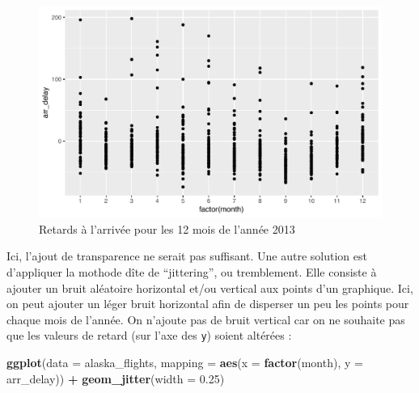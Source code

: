 \documentclass[a4paperpaper,]{article}
\newenvironment{Shaded}{\begin{snugshade}}{\end{snugshade}}
\newcommand{\KeywordTok}[1]{\textcolor[rgb]{0.13,0.29,0.53}{\textbf{#1}}}
\newcommand{\DataTypeTok}[1]{\textcolor[rgb]{0.13,0.29,0.53}{#1}}
\newcommand{\FloatTok}[1]{\textcolor[rgb]{0.00,0.00,0.81}{#1}}
\newcommand{\StringTok}[1]{\textcolor[rgb]{0.31,0.60,0.02}{#1}}
\newcommand{\OperatorTok}[1]{\textcolor[rgb]{0.81,0.36,0.00}{\textbf{#1}}}
\newcommand{\NormalTok}[1]{#1}
\theoremstyle{definition}
\theoremstyle{definition}
\theoremstyle{definition}
\theoremstyle{remark}
\begin{document}
\begin{figure}[htpb]

{\centering \includegraphics[width=0.9\linewidth]{figure/unnamed-chunk-41-1} 

}

\caption{Retards à l'arrivée pour les 12 mois de l'année 2013}\label{fig:unnamed-chunk-41}
\end{figure}

Ici, l'ajout de transparence ne serait pas suffisant. Une autre solution
est d'appliquer la mothode dîte de ``jittering'', ou tremblement. Elle
consiste à ajouter un bruit aléatoire horizontal et/ou vertical aux
points d'un graphique. Ici, on peut ajouter un léger bruit horizontal
afin de disperser un peu les points pour chaque mois de l'année. On
n'ajoute pas de bruit vertical car on ne souhaite pas que les valeurs de
retard (sur l'axe des \texttt{y}) soient altérées :

\begin{Shaded}
\begin{Highlighting}[]
\KeywordTok{ggplot}\NormalTok{(}\DataTypeTok{data =}\NormalTok{ alaska_flights, }\DataTypeTok{mapping =} \KeywordTok{aes}\NormalTok{(}\DataTypeTok{x =} \KeywordTok{factor}\NormalTok{(month), }\DataTypeTok{y =}\NormalTok{ arr_delay)) }\OperatorTok{+}
\StringTok{  }\KeywordTok{geom_jitter}\NormalTok{(}\DataTypeTok{width =} \FloatTok{0.25}\NormalTok{)}
\end{Highlighting}
\end{Shaded}
\end{document}
